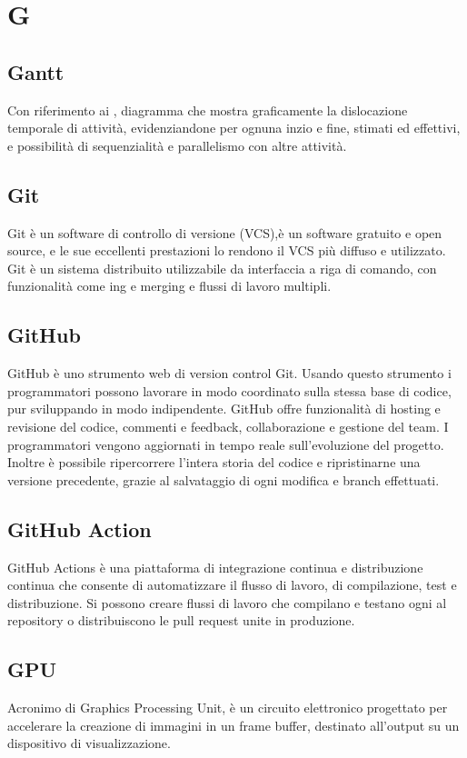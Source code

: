 \chapter{G}

\section{Gantt}
Con riferimento ai , diagramma che mostra graficamente la dislocazione temporale di attività, evidenziandone per ognuna inzio e fine, stimati ed effettivi, e possibilità di sequenzialità e parallelismo con altre attività.

\section{Git}
Git è un software di controllo di versione (VCS),è un software gratuito e open source, e le sue eccellenti prestazioni lo rendono il VCS più diffuso e utilizzato.
Git è un sistema distribuito utilizzabile da interfaccia a riga di comando, con funzionalità come ing e merging e flussi di lavoro multipli.

\section{GitHub}
GitHub è uno strumento web di version control Git. Usando questo strumento i programmatori possono lavorare in modo coordinato sulla stessa base di codice, pur sviluppando in modo indipendente.
GitHub offre funzionalità di hosting e revisione del codice, commenti e feedback, collaborazione e gestione del team. I programmatori vengono aggiornati in tempo reale sull'evoluzione del progetto. Inoltre è possibile ripercorrere l'intera storia del codice e ripristinarne una versione precedente, grazie al salvataggio di ogni modifica e branch effettuati.

\section{GitHub Action}\label{sec:GitHub Actions}
GitHub Actions è una piattaforma di integrazione continua e distribuzione continua che consente di automatizzare il flusso di lavoro, di compilazione, test e distribuzione. Si possono creare flussi di lavoro che compilano e testano ogni  al repository o distribuiscono le pull request unite in produzione.

\section{GPU}
Acronimo di Graphics  Processing Unit, è un circuito elettronico progettato per accelerare la creazione di immagini in un frame buffer, destinato all'output su un dispositivo di visualizzazione.